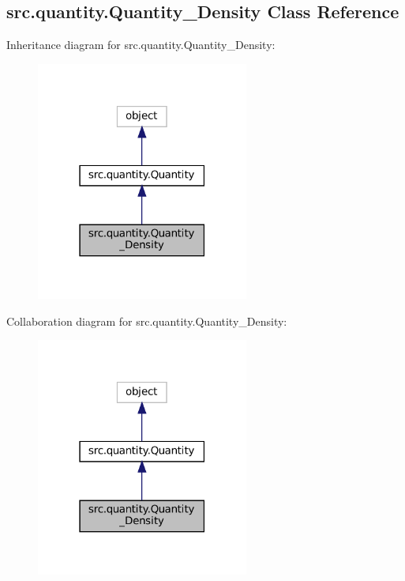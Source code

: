 \hypertarget{classsrc_1_1quantity_1_1Quantity__Density}{}\subsection{src.\+quantity.\+Quantity\+\_\+\+Density Class Reference}
\label{classsrc_1_1quantity_1_1Quantity__Density}


Inheritance diagram for src.\+quantity.\+Quantity\+\_\+\+Density\+:
\nopagebreak
\begin{figure}[H]
\begin{center}
\leavevmode
\includegraphics[width=198pt]{classsrc_1_1quantity_1_1Quantity__Density__inherit__graph}
\end{center}
\end{figure}


Collaboration diagram for src.\+quantity.\+Quantity\+\_\+\+Density\+:
\nopagebreak
\begin{figure}[H]
\begin{center}
\leavevmode
\includegraphics[width=198pt]{classsrc_1_1quantity_1_1Quantity__Density__coll__graph}
\end{center}
\end{figure}
